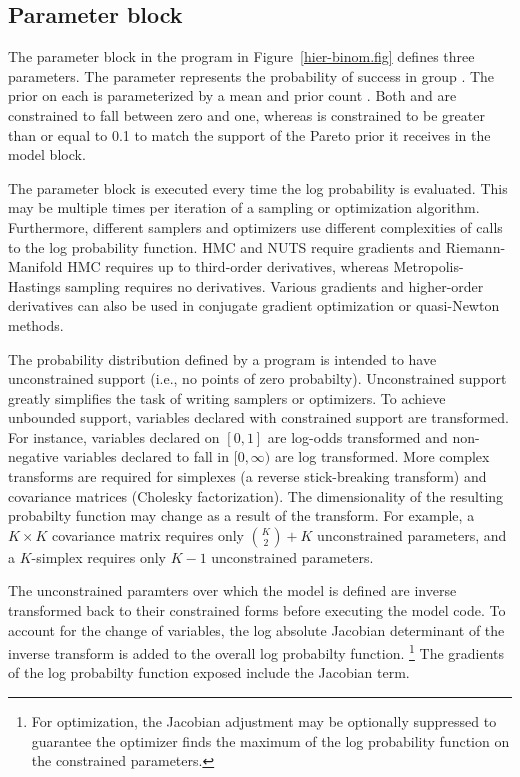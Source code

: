 \documentclass[article]{jss}
\begin{document}
\subsection{Parameter block}

The parameter block in the program in Figure~\ref{hier-binom.fig}
defines three parameters.  The parameter  represents
the probability of success in group .  The prior on each
 is parameterized by a mean  and prior
count .  Both  and  are
constrained to fall between zero and one, whereas  is
constrained to be greater than or equal to 0.1 to match the support of
the Pareto prior it receives in the model block.

The parameter block is executed every time the log probability is
evaluated.  This may be multiple times per iteration of a sampling or
optimization algorithm.  Furthermore, different samplers and
optimizers use different complexities of calls to the log probability
function.  HMC and NUTS require gradients and Riemann-Manifold HMC
\cite{GirolamiCalderhead:2011,Betancourt:2012} requires up to third-order derivatives,
whereas Metropolis-Hastings sampling requires no derivatives.  Various
gradients and higher-order derivatives can also be used in conjugate
gradient optimization or quasi-Newton methods.

The probability distribution defined by a  program is
intended to have unconstrained support (i.e., no points of zero
probabilty).  Unconstrained support greatly simplifies the task of
writing samplers or optimizers.  To achieve unbounded support,
variables declared with constrained support are transformed.  For
instance, variables declared on $[0,1]$ are log-odds transformed and
non-negative variables declared to fall in $[0,\infty)$ are log
transformed.  More complex transforms are required for simplexes (a
reverse stick-breaking transform) and covariance matrices (Cholesky
factorization).  The dimensionality of the resulting probabilty
function may change as a result of the transform. For example, a $K
\times K$ covariance matrix requires only ${K \choose 2} + K$
unconstrained parameters, and a $K$-simplex requires only $K-1$
unconstrained parameters.

The unconstrained paramters over which the model is defined are
inverse transformed back to their constrained forms before executing
the model code.  To account for the change of variables, the log
absolute Jacobian determinant of the inverse transform is added to the
overall log probabilty function.%
%
\footnote{For optimization, the Jacobian adjustment may be optionally
  suppressed to guarantee the optimizer finds the maximum of the log
  probability function on the constrained parameters.}
%
The gradients of the log probabilty function exposed include the
Jacobian term.  
\end{document}
